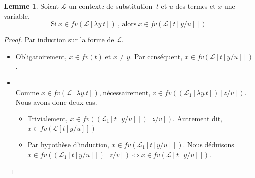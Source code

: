 \documentclass[11pt,a4paper]{article}
\theoremstyle{definition}
\newtheorem{lemma}[theorem]{Lemme}
\begin{document}
\begin{lemma}
  \label{lemma1}
  Soient $\mathcal{L}$ un contexte de substitution, $t$ et $u$ des termes et $x$ une variable.
  \[ 
    \text{Si}~x \in fv(\mathcal{L}[\lambda y.t])~\text{, alors}~x \in fv(\mathcal{L}[t[y/u]])
  \]
\end{lemma}
\begin{proof}
  Par induction sur la forme de $\mathcal{L}$.
  \begin{itemize}
    \item {} Obligatoirement, $x\in fv(t)$ et $x\neq y$.
      Par conséquent, $x\in fv(\mathcal{L}[t[y/u]])$.
    \item {}\\
      Comme $x\in fv(\mathcal{L}[\lambda y.t])$, nécessairement, $x \in fv((\mathcal{L}_1[\lambda y.t])[z/v])$. Nous avons donc deux cas.
      \begin{itemize}
        \item {} Trivialement, $x \in fv((\mathcal{L}_1[t[y/u]])[z/v])$. Autrement dit, $x\in fv(\mathcal{L}[t[y/u]])$
        \item {}
          Par hypothèse d'induction, $x\in fv(\mathcal{L}_1[t[y/u]])$.
          Nous déduisons $x \in fv((\mathcal{L}_1[t[y/u]])[z/v]) \Leftrightarrow x\in fv(\mathcal{L}[t[y/u]])$.
      \end{itemize}
  \end{itemize}
\end{proof}
\end{document}
